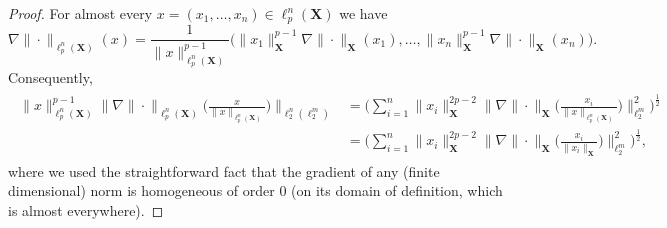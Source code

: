 \documentclass[11pt,reqno]{amsart}
\newcommand{\X}{\mathbf X}
\theoremstyle{remark}
\renewcommand{\1}{\mathbf 1}
\begin{document}
\begin{proof} For almost every $x=(x_1,\ldots, x_n)\in \ell_p^n(\X)$ we have
$$
\nabla\|\cdot\|_{\ell_p^n(\X)}(x)=\frac{1}{\|x\|_{\ell_p^n(\X)}^{p-1}}\big(\|x_1\|_{\X}^{p-1}\nabla\|\cdot\|_{\X}(x_1),
\ldots,\|x_n\|_{\X}^{p-1}\nabla\|\cdot\|_{\X}(x_n)\big).
$$
Consequently,
\begin{align}\label{eq:normalized gradient identity}
\begin{split}
\|x\|_{\ell_p^n(\X)}^{p-1} \Big\|\nabla\|\cdot\|_{\ell_p^n(\X)}\Big(\frac{x}{\|x\|_{\ell_p^n(\X)}}\Big)\Big\|_{\ell_2^n(\ell_2^m)}&=\bigg(\sum_{i=1}^n \|x_i\|_{\X}^{2p-2}\Big\|\nabla\|\cdot\|_{\X}\Big(\frac{x_i}{\|x\|_{\ell_p^n(\X)}}\Big)\Big\|_{\ell_2^{m}}^2\bigg)^{\frac{1}{2}}\\
&= \bigg(\sum_{i=1}^n \|x_i\|_{\X}^{2p-2}\Big\|\nabla\|\cdot\|_{\X}\Big(\frac{x_i}{\|x_i\|_{\X}}\Big)\Big\|_{\ell_2^{m}}^2\bigg)^{\frac{1}{2}},
\end{split}
\end{align}
where we used the straightforward fact that the gradient of any (finite dimensional) norm is homogeneous of order $0$ (on its domain of definition, which is almost everywhere).


\end{proof}
\end{document}
